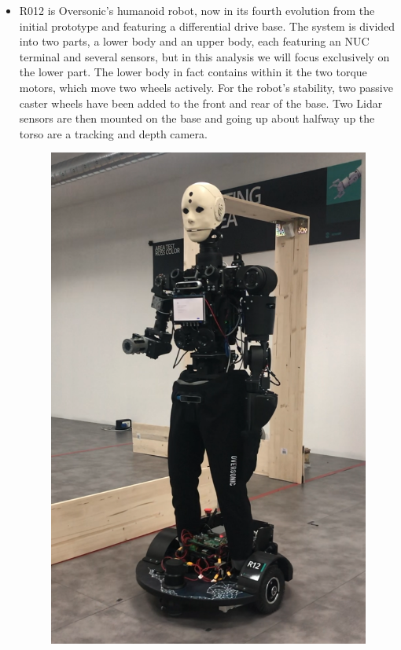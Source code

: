 \begin{itemize}
\begin{figure}[H]
        \label{fig:r007}
    \end{figure}
    \item R012 is Oversonic's humanoid robot, now in its fourth evolution from the initial prototype and featuring a differential drive base. The system is divided into two parts, a lower body and an upper body, each featuring an NUC terminal and several sensors, but in this analysis we will focus exclusively on the lower part. 
    The lower body in fact contains within it the two torque motors, which move two wheels actively. For the robot's stability, two passive caster wheels have been added to the front and rear of the base. Two Lidar sensors are then mounted on the base and going up about halfway up the torso are a tracking and depth camera. 
    \begin{figure}[H]
        \centering
        \includegraphics[scale=0.15]{Images/Chapter 3/r012.PNG}

\end{figure}
\end{itemize}
